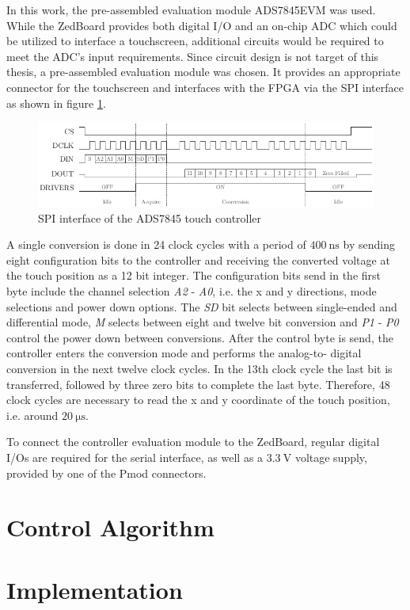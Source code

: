 In this work, the pre-assembled evaluation module ADS7845EVM \citep{ADS06} was
used. While the ZedBoard provides both digital I/O and an on-chip \ac{ADC}
which could be utilized to interface a touchscreen, additional circuits would
be required to meet the \ac{ADC}'s input requirements. Since circuit design is
not target of this thesis, a pre-assembled evaluation module was chosen. It
provides an appropriate connector for the touchscreen and interfaces with the
\ac{FPGA} via the \ac{SPI} interface as shown in figure \ref{fig:touch_spi}.
\begin{figure}
	\centering
	\includegraphics{../figures/touch_spi}
	\caption{\acs{SPI} interface of the ADS7845 touch controller}
	\label{fig:touch_spi}
\end{figure}
A single conversion is done in 24 clock cycles with a period of
$\SI{400}{\nano\second}$ by sending eight configuration bits to the controller
and receiving the converted voltage at the touch position as a 12 bit integer.
The configuration bits send in the first byte include the channel selection
\emph{A2} - \emph{A0}, i.e. the x and y directions, mode selections and power
down options. The \emph{SD} bit selects between single-ended and differential
mode, \emph{M} selects between eight and twelve bit conversion and \emph{P1} -
\emph{P0} control the power down between conversions. After the control byte
is send, the controller enters the conversion mode and performs the analog-to-
digital conversion in the next twelve clock cycles. In the 13th clock cycle
the last bit is transferred, followed by three zero bits to complete the last
byte. Therefore, 48 clock cycles are necessary to read the x and y coordinate
of the touch position, i.e. around $\SI{20}{\micro\second}$.

To connect the controller evaluation module to the ZedBoard, regular digital
I/Os are required for the serial interface, as well as a $\SI{3.3}{\volt}$
voltage supply, provided by one of the \ac{Pmod} connectors.

\section{Control Algorithm}

\section{Implementation}